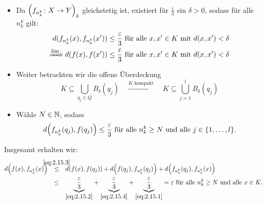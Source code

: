 \begin{beweis}
\begin{itemize}
\[		\]
		\item Da $\enbrace*{f_{n_k^k} \colon X \rightarrow Y}_k$ gleichstetig ist, existiert für $\frac{\varepsilon}{3}$ ein $\delta > 0$, sodass für alle $n_k^k$ gilt:
		\begin{align}
			d(f_{n_k^k}(x),f_{n_k^k}(x')) &\leq \frac{\varepsilon}{3} \text{ für alle } x,x' \in K \text{ mit } d(x,x') < \delta \label{eq:2.15.1} \\
			\xRightarrow{\lim} d(f(x),f(x')) &\leq \frac{\varepsilon}{3} \text{ für alle } x,x' \in K \text{ mit } d(x,x') < \delta \label{eq:2.15.2}
		\end{align}
		\item Weiter betrachten wir die offene Überdeckung
		\begin{equation}
			K \subseteq \bigcup_{q_j \in Q} B_\delta (q_j) \quad \xrightarrow{K \text{ kompakt}} \quad K \subseteq \bigcup_{j=1}^l B_\delta (q_j) \label{eq:2.15.3}
		\end{equation}
		\item Wähle $N \in \NN$, sodass
		\begin{equation}
			d\enbrace*{f_{n_k^k}(q_j),f(q_j)} \leq \frac{\varepsilon}{3} \text{ für alle } n_k^k \geq N \text{ und alle } j \in \{1, \dots, l\}. \label{eq:2.15.4}
		\end{equation}
	\end{itemize}
	Insgesamt erhalten wir:
	\begin{align*}
		d\enbrace*{f(x),f_{n_k^k}(x)} &\stack{\eqref{eq:2.15.3}}{\leq} d(f(x),f(q_j)) + d\enbrace*{f(q_j),f_{n_k^k}(q_j)} + d\enbrace*{f_{n_k^k}(q_j),f_{n_k^k}(x)} \\
		&\stack{}{\leq} \Underbrace{\frac{\varepsilon}{3}}{\eqref{eq:2.15.2}} + \Underbrace{\frac{\varepsilon}{3}}{\eqref{eq:2.15.4}} + \Underbrace{\frac{\varepsilon}{3}}{\eqref{eq:2.15.1}} = \varepsilon \text{ für alle } n_k^k \geq N \text{ und alle } x \in K.
	\end{align*}
\end{beweis}

